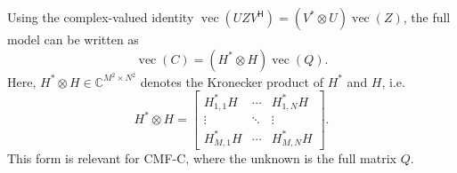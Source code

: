 \documentclass[peer-review]{fa2026}
\begin{document}
Using the complex-valued identity $\operatorname{vec}(U Z V^\mathsf{H}) = (V^* \otimes U)\operatorname{vec}(Z)$, the full model can be written as
\begin{equation}
    \operatorname{vec}(C) = (H^* \otimes H)\operatorname{vec}(Q) .
\end{equation}
Here, $H^* \otimes H \in \mathbb{C}^{M^2 \times N^2}$ denotes the Kronecker product of $H^*$ and $H$, i.e.
\begin{equation}
    H^* \otimes H =
    \begin{bmatrix}
        H_{1,1}^* H & \cdots & H_{1,N}^* H \\
        \vdots & \ddots & \vdots \\
        H_{M,1}^* H & \cdots & H_{M,N}^* H
    \end{bmatrix} .
\end{equation}
This form is relevant for CMF-C, where the unknown is the full matrix $Q$.
\end{document}
